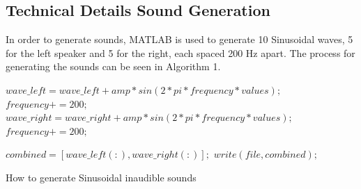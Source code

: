 \documentclass{acm_proc_article-sp}
\begin{document}
\subsection{Technical Details Sound Generation} \label{technical_details Sound Mixing}
In order to generate sounds, MATLAB is used to generate 10 Sinusoidal waves, 5 for the left speaker and 5 for the right, each spaced 200 Hz apart. The process for generating the sounds can be seen in Algorithm 1.

\begin{algorithm}
\setlength{\parindent}{0cm}
{$wave\_left = wave\_left + amp*sin(2*pi*frequency*values);$
$frequency += 200;$}
{$wave\_right = wave\_right + amp*sin(2*pi*frequency*values);$
$frequency += 200;$}

$
combined = [wave\_left(:), wave\_right(:)];
$
$write(file, combined);$

\caption{How to generate Sinusoidal inaudible sounds}
\end{algorithm}
\end{document}
